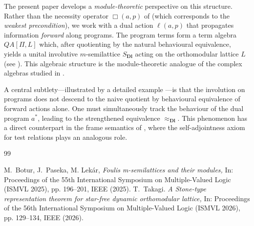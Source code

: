 \documentclass[a4paper]{article} %
\begin{document}
The present paper develops a \emph{module-theoretic} perspective on this structure. Rather than 
the necessity operator $\Box(a,p)$ of \cite{Takagi} (which corresponds to the \emph{weakest 
precondition}), we work with a dual action $\ell(a,p)$ that propagates information 
\emph{forward} along programs. The program terms form a term algebra $QA[\Pi, L]$ which, after 
quotienting by the natural behavioural equivalence, yields a unital involutive $m$-semilattice 
$S_{\mathbf{Dl}}$ acting on the orthomodular lattice $L$ (see \cite{BLP}). This algebraic structure is the 
module-theoretic analogue of the complex algebras studied in \cite{Takagi}.

A central subtlety---illustrated by a detailed example ---is that 
the involution on programs does not descend to the naive quotient by behavioural equivalence of 
forward actions alone. One must simultaneously track the behaviour of the dual program $a^*$, 
leading to the strengthened equivalence $\approx_{\mathbf{Dl}}$. This phenomenon has a direct 
counterpart in the frame semantics of \cite{Takagi}, where the self-adjointness axiom for 
test relations plays an analogous role.




\begin{thebibliography}{99}

M.~Botur, J.~Paseka, M. Lekár,  
\newblock \emph{Foulis m-semilattices and their modules,} 
\newblock  In: {Proceedings of the 55th International Symposium on Multiple-Valued Logic (ISMVL 2025)}, pp. 196--201, IEEE (2025).
T.~Takagi.
\newblock \emph{A Stone-type representation theorem for star-free dynamic   orthomodular lattice,}
\newblock In: {Proceedings of the 56th International Symposium on Multiple-Valued Logic (ISMVL 2026)}, pp. 129--134, IEEE (2026). 

\end{thebibliography}
\end{document}

